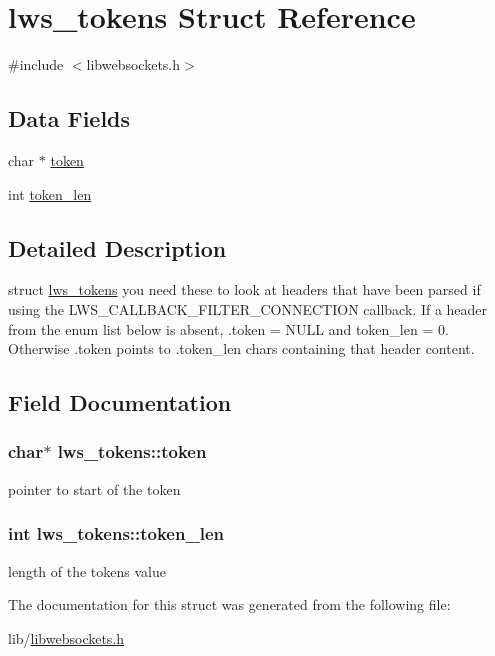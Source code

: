 \hypertarget{structlws__tokens}{}\section{lws\+\_\+tokens Struct Reference}
\label{structlws__tokens}


{\ttfamily \#include $<$libwebsockets.\+h$>$}

\subsection*{Data Fields}
\begin{DoxyCompactItemize}
\item 
char $\ast$ \hyperlink{structlws__tokens_a9f3635412bc71a5cb78e9862b55f10cd}{token}
\item 
int \hyperlink{structlws__tokens_a855b7375d1d58516c0ecd4b60e9a7766}{token\+\_\+len}
\end{DoxyCompactItemize}


\subsection{Detailed Description}
struct \hyperlink{structlws__tokens}{lws\+\_\+tokens} you need these to look at headers that have been parsed if using the L\+W\+S\+\_\+\+C\+A\+L\+L\+B\+A\+C\+K\+\_\+\+F\+I\+L\+T\+E\+R\+\_\+\+C\+O\+N\+N\+E\+C\+T\+I\+ON callback. If a header from the enum list below is absent, .token = N\+U\+LL and token\+\_\+len = 0. Otherwise .token points to .token\+\_\+len chars containing that header content. 

\subsection{Field Documentation}
\subsubsection[{\texorpdfstring{token}{token}}]{\setlength{\rightskip}{0pt plus 5cm}char$\ast$ lws\+\_\+tokens\+::token}\hypertarget{structlws__tokens_a9f3635412bc71a5cb78e9862b55f10cd}{}\label{structlws__tokens_a9f3635412bc71a5cb78e9862b55f10cd}
pointer to start of the token 
\subsubsection[{\texorpdfstring{token\+\_\+len}{token\_len}}]{\setlength{\rightskip}{0pt plus 5cm}int lws\+\_\+tokens\+::token\+\_\+len}\hypertarget{structlws__tokens_a855b7375d1d58516c0ecd4b60e9a7766}{}\label{structlws__tokens_a855b7375d1d58516c0ecd4b60e9a7766}
length of the token\textquotesingle{}s value 

The documentation for this struct was generated from the following file\+:\begin{DoxyCompactItemize}
\item 
lib/\hyperlink{libwebsockets_8h}{libwebsockets.\+h}\end{DoxyCompactItemize}
